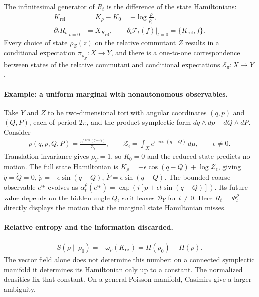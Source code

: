 \documentclass[a4paper,11pt]{article}
\theoremstyle{definition}
\theoremstyle{remark}
\newcommand{\mB}{\mathcal{B}}
\newcommand{\mE}{\mathcal{E}}
\begin{document}
The infinitesimal generator of $R_t$ is the difference of the state Hamiltonians:
\begin{align}\label{eq:classical-relative-Hamiltonian}
    K_{\mathrm{rel}}&=K_\rho-K_0=-\log\frac{\rho}{\rho_0},\nonumber\\
    \left.\partial_tR_t\right|_{t=0}&=X_{K_{\mathrm{rel}}},\qquad
    \left.\partial_t\mathcal{T}_t(f)\right|_{t=0}=\{K_{\mathrm{rel}},f\}.
\end{align}
Every choice of state $\rho_Z(z)$ on the relative commutant $Z$ results in a
conditional expectation $\pi_{\rho_Z}:X\to Y$, and there is a one-to-one
correspondence between states of the relative commutant and conditional expectations
$\mE_\pi:X\to Y$.
 
\paragraph{Example: a uniform marginal with nonautonomous observables.}
Take $Y$ and $Z$ to be two-dimensional tori with angular coordinates $(q,p)$ and
$(Q,P)$, each of period $2\pi$, and the product symplectic form
$dq\wedge dp+dQ\wedge dP$.  Consider
\begin{align}
    \rho(q,p,Q,P)=\frac{e^{\epsilon\cos(q-Q)}}{\mathcal{Z}_\epsilon},\qquad
    \mathcal{Z}_\epsilon=\int_X e^{\epsilon\cos(q-Q)}\,d\mu,\qquad \epsilon\ne0.
\end{align}
Translation invariance gives $\rho_Y=1$, so $K_0=0$ and the reduced state predicts no
motion.  The full state Hamiltonian is $K_\rho=-\epsilon\cos(q-Q)+\log\mathcal{Z}_\epsilon$,
giving $\dot q=\dot Q=0$, $\dot p=-\epsilon\sin(q-Q)$, $\dot P=\epsilon\sin(q-Q)$.
The bounded coarse observable $e^{ip}$ evolves as
$\alpha_t^\rho(e^{ip})=\exp(i[p+\epsilon t\sin(q-Q)])$.  Its future value depends on
the hidden angle $Q$, so it leaves $\mB_Y$ for $t\ne0$.  Here $R_t=\Phi_t^\rho$
directly displays the motion that the marginal state Hamiltonian misses.
 
\paragraph{Relative entropy and the information discarded.}
\begin{align}\label{eq:classical-relative-entropy-Hamiltonian}
    S(\rho\|\rho_0)=-\omega_\rho(K_{\mathrm{rel}})=H(\rho_0)-H(\rho).
\end{align}
The vector field alone does not determine this number: on a connected symplectic
manifold it determines its Hamiltonian only up to a constant.  The normalized densities
fix that constant.  On a general Poisson manifold, Casimirs give a larger ambiguity.
 
\end{document}
